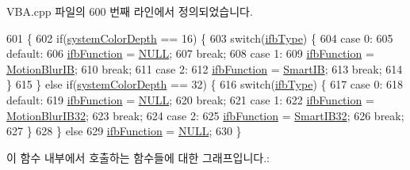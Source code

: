 V\+B\+A.\+cpp 파일의 600 번째 라인에서 정의되었습니다.


\begin{DoxyCode}
601 \{
602   \textcolor{keywordflow}{if}(\mbox{\hyperlink{_v_b_a_8cpp_adaf454a4617a00b5cfed14c203ab6efa}{systemColorDepth}} == 16) \{
603     \textcolor{keywordflow}{switch}(\mbox{\hyperlink{class_v_b_a_a4349741c5cec8852f8914093484418e8}{ifbType}}) \{
604     \textcolor{keywordflow}{case} 0:
605     \textcolor{keywordflow}{default}:
606       \mbox{\hyperlink{class_v_b_a_af044c0f19b7118a5cc01cf25e059145e}{ifbFunction}} = \mbox{\hyperlink{getopt1_8c_a070d2ce7b6bb7e5c05602aa8c308d0c4}{NULL}};
607       \textcolor{keywordflow}{break};
608     \textcolor{keywordflow}{case} 1:
609       \mbox{\hyperlink{class_v_b_a_af044c0f19b7118a5cc01cf25e059145e}{ifbFunction}} = \mbox{\hyperlink{_v_b_a_8cpp_a4b388a2f01620e0bf2e9a1c10c189866}{MotionBlurIB}};
610       \textcolor{keywordflow}{break};
611     \textcolor{keywordflow}{case} 2:
612       \mbox{\hyperlink{class_v_b_a_af044c0f19b7118a5cc01cf25e059145e}{ifbFunction}} = \mbox{\hyperlink{_v_b_a_8cpp_a9f004c820bb4707dd9a43c2c3e9c851d}{SmartIB}};
613       \textcolor{keywordflow}{break};
614     \}
615   \} \textcolor{keywordflow}{else} \textcolor{keywordflow}{if}(\mbox{\hyperlink{_v_b_a_8cpp_adaf454a4617a00b5cfed14c203ab6efa}{systemColorDepth}} == 32) \{
616     \textcolor{keywordflow}{switch}(\mbox{\hyperlink{class_v_b_a_a4349741c5cec8852f8914093484418e8}{ifbType}}) \{
617     \textcolor{keywordflow}{case} 0:
618     \textcolor{keywordflow}{default}:
619       \mbox{\hyperlink{class_v_b_a_af044c0f19b7118a5cc01cf25e059145e}{ifbFunction}} = \mbox{\hyperlink{getopt1_8c_a070d2ce7b6bb7e5c05602aa8c308d0c4}{NULL}};
620       \textcolor{keywordflow}{break};
621     \textcolor{keywordflow}{case} 1:
622       \mbox{\hyperlink{class_v_b_a_af044c0f19b7118a5cc01cf25e059145e}{ifbFunction}} = \mbox{\hyperlink{_v_b_a_8cpp_afd60c9159e817571e02d1958b27b7f76}{MotionBlurIB32}};
623       \textcolor{keywordflow}{break};
624     \textcolor{keywordflow}{case} 2:
625       \mbox{\hyperlink{class_v_b_a_af044c0f19b7118a5cc01cf25e059145e}{ifbFunction}} = \mbox{\hyperlink{_v_b_a_8cpp_a408385952d763c13c6be333f2989f7fb}{SmartIB32}};
626       \textcolor{keywordflow}{break};
627     \}
628   \} \textcolor{keywordflow}{else}
629     \mbox{\hyperlink{class_v_b_a_af044c0f19b7118a5cc01cf25e059145e}{ifbFunction}} = \mbox{\hyperlink{getopt1_8c_a070d2ce7b6bb7e5c05602aa8c308d0c4}{NULL}};
630 \}
\end{DoxyCode}
이 함수 내부에서 호출하는 함수들에 대한 그래프입니다.\+:
